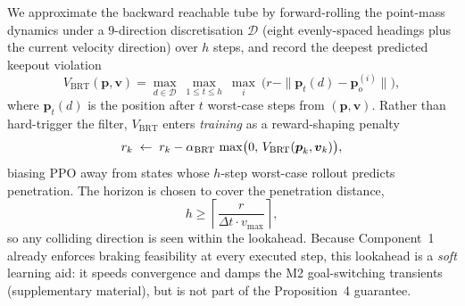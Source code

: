 \documentclass[letterpaper]{article}
\begin{document}
We approximate the backward reachable tube by forward-rolling the point-mass dynamics under a $9$-direction discretisation $\mathcal{D}$ (eight evenly-spaced headings plus the current velocity direction) over $h$ steps, and record the deepest predicted keepout violation
\begin{equation}
V_\text{BRT}(\boldsymbol{p},\boldsymbol{v}) = \max_{d \in \mathcal{D}}\ \max_{1\le t\le h}\ \max_i\ \bigl(r - \|\boldsymbol{p}_t(d) - \boldsymbol{p}_o^{(i)}\|\bigr),
\label{eq:brt}
\end{equation}
where $\boldsymbol{p}_t(d)$ is the position after $t$ worst-case steps from $(\boldsymbol{p},\boldsymbol{v})$. Rather than hard-trigger the filter, $V_\text{BRT}$ enters \emph{training} as a reward-shaping penalty
\begin{equation}
r_k \;\leftarrow\; r_k - \alpha_\text{BRT}\,\max\bigl(0,\,V_\text{BRT}(\boldsymbol{p}_k,\boldsymbol{v}_k)\bigr),
\notag
\end{equation}
biasing PPO away from states whose $h$-step worst-case rollout predicts penetration. The horizon is chosen to cover the penetration distance,
\begin{equation}
h \ge \left\lceil \frac{r}{\Delta t \cdot v_{\max}} \right\rceil,
\label{eq:h_cond}
\end{equation}
so any colliding direction is seen within the lookahead. Because Component~1 already enforces braking feasibility at every executed step, this lookahead is a \emph{soft} learning aid: it speeds convergence and damps the M2 goal-switching transients (supplementary material), but is not part of the Proposition~4 guarantee.
\end{document}
